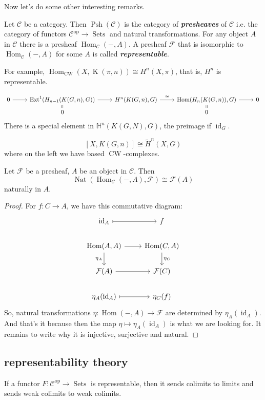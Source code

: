 \documentclass{article}
\renewcommand{\H}{\mathbb{H}}
\newcommand{\Cc}{\mathcal{C}}
\newcommand{\Fc}{\mathcal{F}}
\DeclareMathOperator{\id}{id}
\DeclareMathOperator{\Ext}{Ext}
\DeclareMathOperator{\Hom}{Hom}
\DeclareMathOperator{\K}{K}
\DeclareMathOperator{\CW}{CW}
\DeclareMathOperator{\op}{op}
\DeclareMathOperator{\Psh}{Psh}
\DeclareMathOperator{\Sets}{Sets}
\DeclareMathOperator{\Nat}{Nat}
\begin{document}
Now let's do some other interesting remarks.
\begin{defn}
	Let $\Cc$ be a category. Then $\Psh(\Cc)$ is the category of \textbf{\textit{presheaves}} of $\Cc$ i.e. the category of functors $\Cc^{\op}\to\Sets$ and natural transformations. For any object $A$ in $\Cc$ there is a presheaf $\Hom_{\Cc}(-,A)$. A presheaf $\Fc$ that is isomorphic to $\Hom_\Cc(-,A)$ for some $A$ is called \textbf{\textit{representable}}.
\end{defn}

For example, $\Hom_{\CW}(X,\K(\pi,n))\cong H^n(X,\pi)$, that is, $H^n$ is representable.

\[\begin{tikzcd}[row sep=tiny]
	0\arrow[r]&\Ext^1(H_{n-1}(K(G,n),G))\arrow[r]&H^n(K(G,n),G)\arrow[r,"\cong"]&\Hom(H_n(K(G,n)),G)\arrow[r]&0\\
	&0\arrow[u,equal]&&0\arrow[u,equal]
\end{tikzcd}\]
There is a special element in $\H^n(K(G,N),G)$, the preimage if $\id_G$.
\begin{claim}
	\[[X,K(G,n)]\cong\tilde{H}^n(X,G)\]
	where on the left we have based $\CW$-complexes. 
\end{claim}

\begin{lemma}[Yoneda]
	Let $\Fc$ be a presheaf, $A$ be an object in $\Cc$. Then
	\[\Nat(\Hom_{\Cc}(-,A),\Fc)\cong \Fc(A)\]
	naturally in $A$.
\end{lemma}
\begin{proof} For $f:C\to A$, we have this commutative diagram:
	\[\begin{tikzcd}
		\id_A\arrow[r,maps to]&f\\
		\Hom(A,A)\arrow[r]\arrow[d,swap,"\eta_A"]&\Hom(C,A)\arrow[d,"\eta_C"]\\
		\Fc(A)\arrow[r]&\Fc(C)\\
		\eta_A(\id_A)\arrow[r,maps to]&\eta_C(f)
	\end{tikzcd}\]
	So, natural transformations $\eta:\Hom(-,A)\to \Fc$ are determined by $\eta_A(\id_A)$. And that's it because then the map $\eta\mapsto\eta_A(\id_A)$ is what we are looking for. It remains to write why it is injective, surjective and natural.
\end{proof}

\subsection{representability theory}
If a functor $F:\Cc^{\op}\to\Sets$ is representable, then it sends colimits to limits and sends weak colimits to weak colimits.
\end{document}
